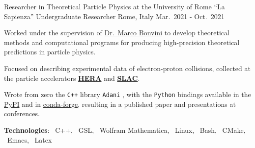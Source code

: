 \begin{cventries}
    \cventry
    {Researcher in Theoretical Particle Physics at the University of Rome ``La Sapienza''}
    {Undergraduate Researcher}
    {Rome, Italy}
    {Mar.\ 2021 - Oct.\ 2021}
    {
        \begin{cvitems} %
            \item Worked under the supervision of \href{https://inspirehep.net/authors/1058479?ui-citation-summary=true}{Dr.\ Marco Bonvini} to develop theoretical methods and computational programs for producing high-precision theoretical predictions in particle physics.
            \item Focused on describing experimental data of electron-proton collisions, collected at the particle accelerators \href{https://en.wikipedia.org/wiki/HERA_(particle_accelerator)}{\textbf{HERA}} and \href{https://en.wikipedia.org/wiki/SLAC_National_Accelerator_Laboratory}{\textbf{SLAC}}.
            \item Wrote from zero the \texttt{C++} library \texttt{Adani} \href{https://github.com/niclaurenti/adani}{\githublogo}, with the \texttt{Python} bindings available in the \href{https://pypi.org/project/adani/}{PyPI} and in \href{https://anaconda.org/conda-forge/adani}{conda-forge}, resulting in a published paper and presentations at conferences.
            \item[] \textbf{\textcolor{awesome-red}{Tec}hnologies}: \cpplogo{}~C++, \gnulogo{}~GSL, \mathematicalogo{}~Wolfram Mathematica, \linuxlogo{}~Linux, \bashlogo{}~Bash, \cmakelogo{}~CMake, \emacslogo{}~Emacs, \latexlogo{}~Latex
        \end{cvitems}
    }

\end{cventries}